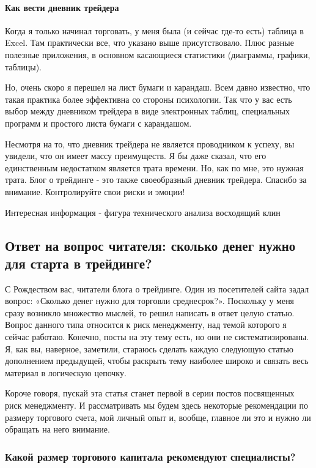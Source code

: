 \documentclass{book}
\begin{document}
\paragraph{Как вести дневник трейдера}

Когда я только начинал торговать, у меня была (и сейчас где-то есть) таблица в Excel. Там практически все, что указано выше присутствовало. Плюс разные полезные приложения, в основном касающиеся статистики (диаграммы, графики, таблицы).

Но, очень скоро я перешел на лист бумаги и карандаш. Всем давно известно, что такая практика более эффективна со стороны психологии. Так что у вас есть выбор между дневником трейдера в виде электронных таблиц, специальных программ и простого листа бумаги с карандашом.

Несмотря на то, что дневник трейдера не является проводником к успеху, вы увидели, что он имеет массу преимуществ. Я бы даже сказал, что его единственным недостатком является трата времени. Но, как по мне, это нужная трата. Блог о трейдинге - это также своеобразный дневник трейдера. Спасибо за внимание. Контролируйте свои риски и эмоции!



Интересная информация - фигура технического анализа восходящий клин

\subsection{Ответ на вопрос читателя: сколько денег нужно для старта в
  трейдинге?}

С Рождеством вас, читатели блога о трейдинге. Один из посетителей сайта задал вопрос: «Сколько денег нужно для торговли среднесрок?». Поскольку у меня сразу возникло множество мыслей, то решил написать в ответ целую статью. Вопрос данного типа относится к риск менеджменту, над темой которого я сейчас работаю. Конечно, посты на эту тему есть, но они не систематизированы. Я, как вы, наверное, заметили, стараюсь сделать каждую следующую статью дополнением предыдущей, чтобы раскрыть тему наиболее широко и связать весь материал в логическую цепочку.

Короче говоря, пускай эта статья станет первой в серии постов
посвященных риск менеджменту. И рассматривать мы будем здесь некоторые
рекомендации по размеру торгового счета, мой личный опыт и, вообще,
главное ли это и нужно ли обращать на него внимание.

\subsubsection{Какой размер торгового капитала рекомендуют
  специалисты?}
\end{document}
